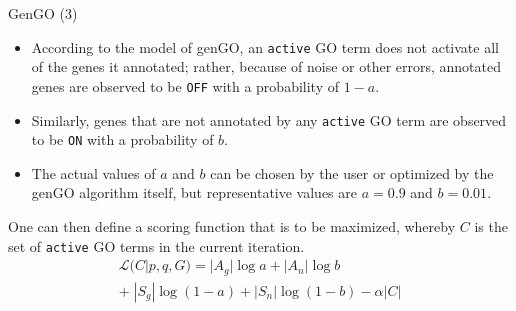 \documentclass{beamer}
\begin{document}
\begin{frame}{GenGO (3)}
\begin{itemize}
 \item  According to the model of genGO, an \texttt{active} GO term does not
activate all of the genes it annotated; rather, because of noise or
other errors, annotated genes are observed to be \texttt{OFF} with a
probability of $1-a$. 
\item Similarly, genes that are not annotated by any
\texttt{active} GO term are observed to be \texttt{ON} with a
probability of $b$. 
\item The actual values of $a$ and $b$ can be chosen by
the user or optimized by the genGO algorithm itself, but
representative values are $a=0.9$ and $b=0.01$.
\end{itemize}

One can then define a scoring function that is to be maximized,
whereby $C$ is the set of \texttt{active} GO terms in the current
iteration.
\begin{multline}
\mathcal{L}(C|p,q,G) = |A_g|\log a + |A_n|\log b  \\ + \; |S_g|\log (1-a)
+ |S_n| \log (1-b) - \alpha |C|
\label{eq:genGO}
\end{multline}
 
\end{frame}
\end{document}
